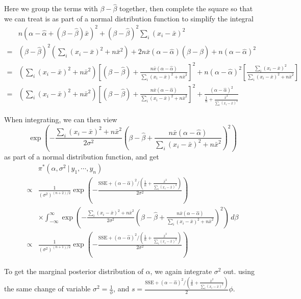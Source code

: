 \documentclass[]{book}
\theoremstyle{definition}
\theoremstyle{definition}
\theoremstyle{definition}
\theoremstyle{remark}
\begin{document}
Here we group the terms with \(\beta-\hat{\beta}\) together, then
complete the square so that we can treat is as part of a normal
distribution function to simplify the integral \[
\begin{aligned}
& n(\alpha-\hat{\alpha}+(\beta-\hat{\beta})\bar{x})^2+(\beta-\hat{\beta})^2\sum_i(x_i-\bar{x})^2 \\
= & (\beta-\hat{\beta})^2\left(\sum_i (x_i-\bar{x})^2 + n\bar{x}^2\right) + 2n\bar{x}(\alpha-\hat{\alpha})(\beta-\hat{\beta}) + n(\alpha-\hat{\alpha})^2 \\
= & \left(\sum_i (x_i-\bar{x})^2 + n\bar{x}^2\right)\left[(\beta-\hat{\beta})+\frac{n\bar{x}(\alpha-\hat{\alpha})}{\sum_i(x_i-\bar{x})^2+n\bar{x}^2}\right]^2+ n(\alpha-\hat{\alpha})^2\left[\frac{\sum_i(x_i-\bar{x})^2}{\sum_i (x_i-\bar{x})^2+n\bar{x}^2}\right]\\
= & \left(\sum_i (x_i-\bar{x})^2 + n\bar{x}^2\right)\left[(\beta-\hat{\beta})+\frac{n\bar{x}(\alpha-\hat{\alpha})}{\sum_i(x_i-\bar{x})^2+n\bar{x}^2}\right]^2+\frac{(\alpha-\hat{\alpha})^2}{\frac{1}{n}+\frac{\bar{x}^2}{\sum_i (x_i-\bar{x})^2}}
\end{aligned}
\]

When integrating, we can then view
\[ \exp\left(-\frac{\sum_i (x_i-\bar{x})^2+n\bar{x}^2}{2\sigma^2}\left(\beta-\hat{\beta}+\frac{n\bar{x}(\alpha-\hat{\alpha})}{\sum_i (x_i-\bar{x})^2+n\bar{x}^2}\right)^2\right) \]
as part of a normal distribution function, and get \[
\begin{aligned}
& \pi^*(\alpha, \sigma^2~|~y_1,\cdots,y_n) \\
\propto & \frac{1}{(\sigma^2)^{(n+2)/2}}\exp\left(-\frac{\text{SSE}+(\alpha-\hat{\alpha})^2/(\frac{1}{n}+\frac{\bar{x}^2}{\sum_i (x_i-\bar{x})^2})}{2\sigma^2}\right)\\
& \times\int_{-\infty}^\infty \exp\left(-\frac{\sum_i (x_i-\bar{x})^2+n\bar{x}^2}{2\sigma^2}\left(\beta-\hat{\beta}+\frac{n\bar{x}(\alpha-\hat{\alpha})}{\sum_i (x_i-\bar{x})^2+n\bar{x}^2}\right)^2\right)\, d\beta \\
\propto & \frac{1}{(\sigma^2)^{(n+1)/2}}\exp\left(-\frac{\text{SSE}+(\alpha-\hat{\alpha})^2/(\frac{1}{n}+\frac{\bar{x}^2}{\sum_i (x_i-\bar{x})^2})}{2\sigma^2}\right)
\end{aligned}
\]

To get the marginal posterior distribution of \(\alpha\), we again
integrate \(\sigma^2\) out. using the same change of variable
\(\displaystyle \sigma^2=\frac{1}{\phi}\), and
\(s=\displaystyle \frac{\text{SSE}+(\alpha-\hat{\alpha})^2/(\frac{1}{n}+\frac{\bar{x}^2}{\sum_i (x_i-\bar{x})^2})}{2}\phi\).
\end{document}
